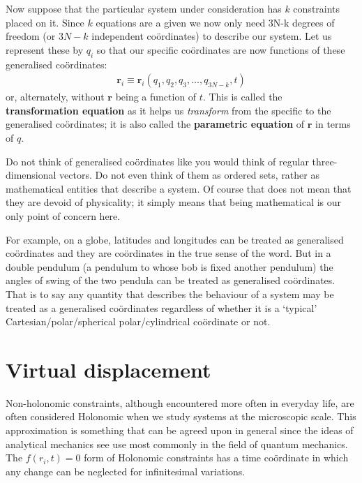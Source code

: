 \documentclass[english,seminar,headertitle]{lecture}
\begin{document}
Now suppose that the particular system under consideration has $k$ constraints placed on it. Since $k$ equations are a given we now only need 3N-k degrees of freedom (or $3N-k$ independent co\"{o}rdinates) to describe our system. Let us represent these by $q_i$ so that our specific co\"{o}rdinates are now functions of these generalised co\"{o}rdinates:
\begin{align}
\mathbf{r}_i \equiv \mathbf{r}_i (q_1, q_2, q_3, \ldots, q_{3N-k},t) \label{eq:gen-coordn}
\end{align}
or, alternately, without $\mathbf{r}$ being a function of $t$. This is called the \textbf{transformation equation} as it helps us \textit{transform} from the specific to the generalised co\"{o}rdinates; it is also called the \textbf{parametric equation} of $\mathbf{r}$ in terms of $q$.

Do not think of generalised co\"{o}rdinates like you would think of regular three-dimensional vectors. Do not even think of them as ordered sets, rather as mathematical entities that describe a system. Of course that does not mean that they are devoid of physicality; it simply means that being mathematical is our only point of concern here.

For example, on a globe, latitudes and longitudes can be treated as generalised co\"{o}rdinates and they are co\"{o}rdinates in the true sense of the word. But in a double pendulum (a pendulum to whose bob is fixed another pendulum) the angles of swing of the two pendula can be treated as generalised co\"{o}rdinates. That is to say any quantity that describes the behaviour of a system may be treated as a generalised co\"{o}rdinates regardless of whether it is a `typical' Cartesian/polar/spherical polar/cylindrical co\"{o}rdinate or not.


\section{Virtual displacement}\label{sec:virtual-work}

Non-holonomic constraints, although encountered more often in everyday life, are often considered Holonomic when we study systems at the microscopic scale. This approximation is something that can be agreed upon in general since the ideas of analytical mechanics see use most commonly in the field of quantum mechanics. The $f(r_i,t) = 0$ form of Holonomic constraints has a time co\"{o}rdinate in which any change can be neglected for infinitesimal variations.
\end{document}
